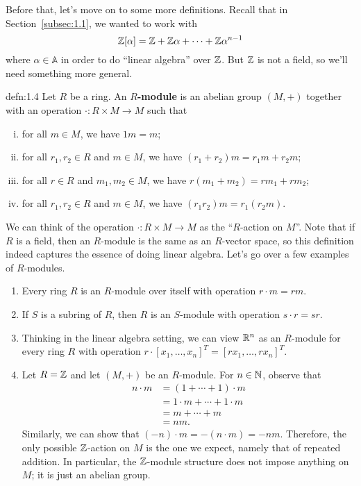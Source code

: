 Before that, let's move on to some more definitions. Recall that in 
Section~\ref{subsec:1.1}, we wanted to work with 
\[ \mathbb{Z}[\alpha] = \mathbb{Z} + \mathbb{Z}\alpha + \cdots + \mathbb{Z}\alpha^{n-1} \] 
where $\alpha \in \mathbb{A}$ in order to do ``linear algebra'' over $\mathbb{Z}$. But $\mathbb{Z}$ is not a field, 
so we'll need something more general.

\begin{defn}{defn:1.4}
    Let $R$ be a ring. An {\bf $R$-module} is an abelian group $(M, +)$ 
    together with an operation $\cdot : R \times M \to M$ such that 
    \begin{enumerate}[(i)]
        \item for all $m \in M$, we have $1m = m$; 
        \item for all $r_1, r_2 \in R$ and $m \in M$, we have 
        $(r_1 + r_2)m = r_1m + r_2m$;
        \item for all $r \in R$ and $m_1, m_2 \in M$, we have 
        $r(m_1 + m_2) = rm_1 + rm_2$; 
        \item for all $r_1, r_2 \in R$ and $m \in M$, we have 
        $(r_1r_2)m = r_1(r_2m)$.
    \end{enumerate}
\end{defn}\vspace{-0.25cm}

We can think of the operation $\cdot : R \times M \to M$ as the ``$R$-action 
on $M$''. Note that if $R$ is a field, then an $R$-module is the same as 
an $R$-vector space, so this definition indeed captures the essence of doing
linear algebra. Let's go over a few examples of $R$-modules. 
\begin{enumerate}[(1)]
    \item Every ring $R$ is an $R$-module over itself with operation 
    $r \cdot m = rm$.
    \item If $S$ is a subring of $R$, then $R$ is an $S$-module with 
    operation $s \cdot r = sr$. 
    \item Thinking in the linear algebra setting, we can view $\mathbb{R}^n$ as an 
    $R$-module for every ring $R$ with operation $r \cdot [x_1, \dots, x_n]^T 
    = [rx_1, \dots, rx_n]^T$. 
    \item Let $R = \mathbb{Z}$ and let $(M, +)$ be an $R$-module. For $n \in \mathbb{N}$, 
    observe that 
    \begin{align*}
        n \cdot m &= (1 + \cdots + 1) \cdot m \\
        &= 1 \cdot m + \cdots + 1 \cdot m \\ 
        &= m + \cdots + m \\ 
        &= nm.
    \end{align*}
    Similarly, we can show that $(-n) \cdot m = -(n \cdot m) = -nm$. Therefore, 
    the only possible $\mathbb{Z}$-action on $M$ is the one we expect, namely that 
    of repeated addition. In particular, the $\mathbb{Z}$-module structure does not 
    impose anything on $M$; it is just an abelian group. 
\end{enumerate}

